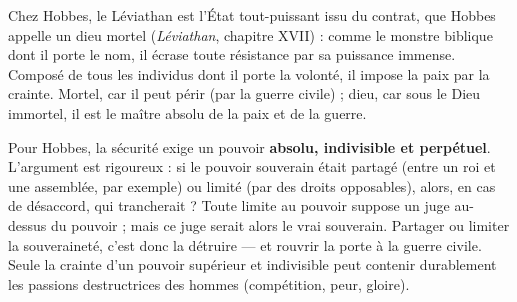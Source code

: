\documentclass[11pt]{article}
\newcommand{\cle}[1]{{\popxbold\color{popdark}#1}}
\begin{document}
\begin{definition}[Le Léviathan]
Chez Hobbes, le \cle{Léviathan} est l'État tout-puissant issu du contrat, que Hobbes appelle un \guillemotleft dieu mortel \guillemotright (\emph{Léviathan}, chapitre XVII) : comme le monstre biblique dont il porte le nom, il écrase toute résistance par sa puissance immense. Composé de tous les individus dont il porte la volonté, il impose la paix par la crainte. Mortel, car il peut périr (par la guerre civile) ; dieu, car sous le Dieu immortel, il est le maître absolu de la paix et de la guerre.
\end{definition}

\begin{propriete}
Pour Hobbes, la sécurité exige un pouvoir \textbf{absolu, indivisible et perpétuel}. L'argument est rigoureux : si le pouvoir souverain était partagé (entre un roi et une assemblée, par exemple) ou limité (par des droits opposables), alors, en cas de désaccord, qui trancherait ? Toute limite au pouvoir suppose un juge au-dessus du pouvoir ; mais ce juge serait alors le vrai souverain. Partager ou limiter la souveraineté, c'est donc la détruire — et rouvrir la porte à la guerre civile. Seule la crainte d'un pouvoir supérieur et indivisible peut contenir durablement les passions destructrices des hommes (compétition, peur, gloire).
\end{propriete}
\end{document}
